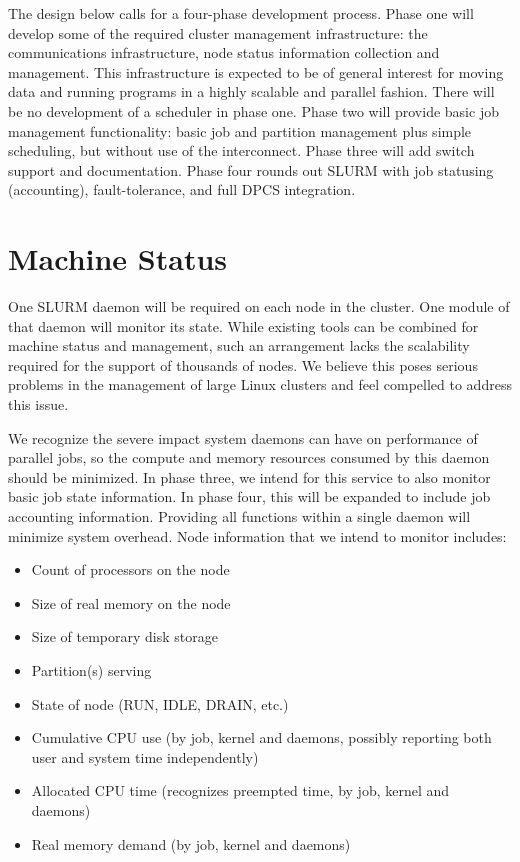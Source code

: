 The design below calls for a four-phase development process. Phase one will
develop some of the required cluster management infrastructure: the communications 
infrastructure, node status information collection and management. This 
infrastructure is expected to be of general interest for moving data and 
running programs in a highly scalable and parallel fashion. There will be no 
development of a scheduler in phase one.
Phase two will provide basic job management functionality: basic job and partition
management plus simple scheduling, but without use of the interconnect. 
Phase three will add switch support and documentation. 
Phase four rounds out SLURM with job statusing (accounting), fault-tolerance, 
and full DPCS integration.


\section{Machine Status}

One SLURM daemon will be required on each node in the cluster.
One module of that daemon will monitor its state.
While existing tools can be combined for machine status and management, such an
arrangement lacks the scalability required for the support of thousands of
nodes. We believe this poses serious problems in the management of large Linux
clusters and feel compelled to address this issue. 

We recognize the severe impact system daemons can have on performance of
parallel jobs, so the compute and memory resources consumed by this daemon
should be minimized. In phase three, we intend for this service to also monitor
basic job state information. In phase four, this will be expanded to include 
job accounting information. Providing all functions
within a single daemon will minimize system overhead. Node information that we
intend to monitor includes:

\begin{itemize}
\item Count of processors on the node
\item Size of real memory on the node
\item Size of temporary disk storage
\item Partition(s) serving
\item State of node (RUN, IDLE, DRAIN, etc.)
\item Cumulative CPU use (by job, kernel and daemons, possibly reporting 
both user and system time independently)
\item Allocated CPU time (recognizes preempted time, by job, kernel and daemons)
\item Real memory demand (by job, kernel and daemons)
\end{itemize}

